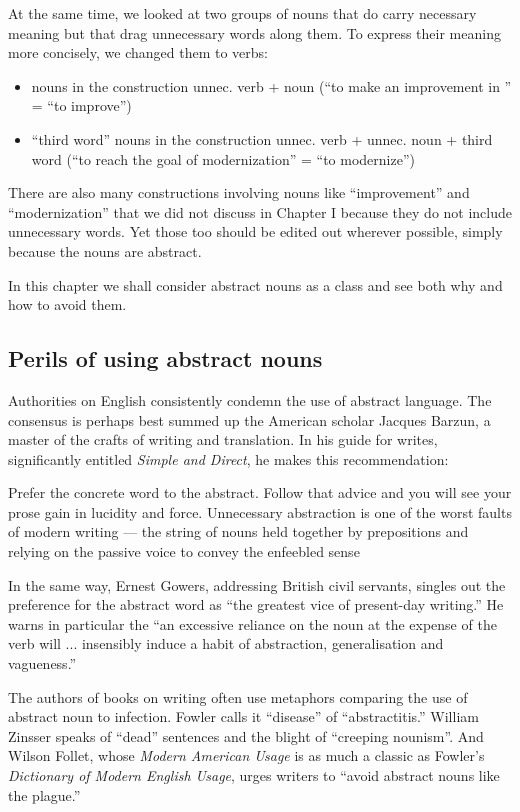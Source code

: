 \documentclass{article}
\begin{document}
At the same time, we looked at two groups of nouns that do carry necessary meaning but that drag unnecessary words along them. To express their meaning more concisely, we changed them to verbs:

\begin{itemize}
  \item nouns in the construction unnec. verb + noun (``to make an improvement in '' = ``to improve'')
  \item ``third word'' nouns in the construction unnec. verb + unnec. noun + third word (``to reach the goal of modernization'' = ``to modernize'')
\end{itemize}

There are also many constructions involving nouns like ``improvement'' and ``modernization'' that we did not discuss in Chapter I because they do not include unnecessary words. Yet those too should be edited out wherever possible, simply because the nouns are abstract.

In this chapter we shall consider abstract nouns as a class and see both why and how to avoid them.


\subsection{Perils of using abstract nouns}

Authorities on English consistently condemn the use of abstract language. The consensus is perhaps best summed up the American scholar Jacques Barzun, a master of the crafts of writing and translation. In his guide for writes, significantly entitled \emph{Simple and Direct}, he makes this recommendation:

Prefer the concrete word to the abstract. Follow that advice and you will see your prose gain in lucidity and force. Unnecessary abstraction is one of the worst faults of modern writing --- the string of nouns held together by prepositions and relying on the passive voice to convey the enfeebled sense

In the same way, Ernest Gowers, addressing British civil servants, singles out the preference for the abstract word as ``the greatest vice of present-day writing.'' He warns in particular the ``an excessive reliance on the noun at the expense of the verb will ... insensibly induce a habit of abstraction, generalisation and vagueness.''

The authors of books on writing often use metaphors comparing the use of abstract noun to infection. Fowler calls it ``disease'' of ``abstractitis.'' William Zinsser speaks of ``dead'' sentences and the blight of ``creeping nounism''. And Wilson Follet, whose \emph{Modern American Usage} is as much a classic as Fowler's \emph{Dictionary of Modern English Usage}, urges writers
to ``avoid abstract nouns like the plague.''
\end{document}
